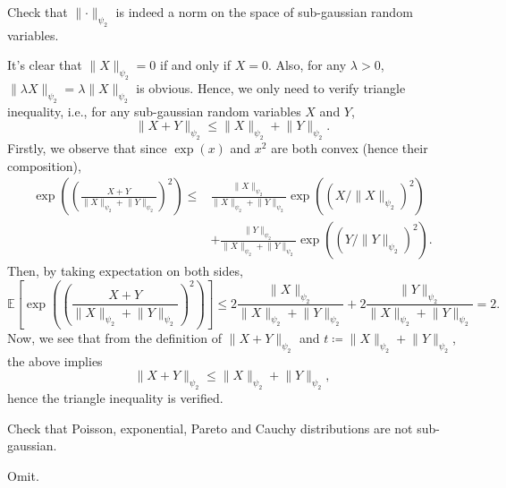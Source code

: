 \begin{problem*}[Exercise 2.5.7]\label{ex2.5.7}
	Check that \(\lVert \cdot \rVert _{\psi _2}\) is indeed a norm on the space of sub-gaussian random variables.
\end{problem*}
\begin{answer}
	It's clear that \(\lVert X \rVert _{\psi _2} = 0 \) if and only if \(X = 0\). Also, for any \(\lambda > 0\), \(\lVert \lambda X \rVert _{\psi _2} = \lambda \lVert X \rVert _{\psi _2}\) is obvious. Hence, we only need to verify triangle inequality, i.e., for any sub-gaussian random variables \(X\) and \(Y\),
	\[
		\lVert X + Y \rVert _{\psi _2}
		\leq \lVert X \rVert _{\psi _2} + \lVert Y \rVert _{\psi _2}.
	\]
	Firstly, we observe that since \(\exp (x)\) and \(x^2\) are both convex (hence their composition),
	\[
		\begin{split}
			\exp (\left( \frac{X + Y}{\lVert X \rVert _{\psi _2} + \lVert Y \rVert _{\psi _2}} \right)^2 )
			\leq & \frac{\lVert X \rVert _{\psi _2}}{\lVert X \rVert _{\psi _2} + \lVert Y \rVert _{\psi _2}} \exp ((X / \lVert X \rVert _{\psi _2})^2)    \\
			     & + \frac{\lVert Y \rVert _{\psi _2}}{\lVert X \rVert _{\psi _2} + \lVert Y \rVert _{\psi _2}} \exp ((Y / \lVert Y \rVert _{\psi _2})^2).
		\end{split}
	\]
	Then, by taking expectation on both sides,
	\[
		\mathbb{E}\left[\exp (\left( \frac{X + Y}{\lVert X \rVert _{\psi _2} + \lVert Y \rVert _{\psi _2}} \right)^2 )\right]
		\leq 2 \frac{\lVert X \rVert _{\psi _2}}{\lVert X \rVert _{\psi _2} + \lVert Y \rVert _{\psi _2}} + 2 \frac{\lVert Y \rVert _{\psi _2}}{\lVert X \rVert _{\psi _2} + \lVert Y \rVert _{\psi _2}}
		= 2.
	\]
	Now, we see that from the definition of \(\lVert X + Y \rVert _{\psi _2}\) and \(t \coloneqq \lVert X \rVert _{\psi _2} + \lVert Y \rVert _{\psi _2}\), the above implies
	\[
		\lVert X + Y \rVert _{\psi _2} \leq \lVert X \rVert _{\psi _2} + \lVert Y \rVert _{\psi _2},
	\]
	hence the triangle inequality is verified.
\end{answer}

\begin{problem*}[Exercise 2.5.9]\label{ex2.5.9}
	Check that Poisson, exponential, Pareto and Cauchy distributions are not sub-gaussian.
\end{problem*}
\begin{answer}
	Omit.
\end{answer}

